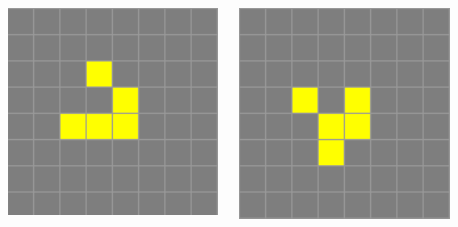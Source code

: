 \documentclass[20pt,margin=2.2cm,innermargin=-4.5in,blockverticalspace=-0.25in]{tikzposter}
\begin{document}
\begin{columns}
{        \begin{minipage}[t]{\linewidth}
            \centering
            \begin{minipage}[t]{0.15\linewidth}
                \includegraphics[width=\textwidth]{images/life-glider-1.png}
            \end{minipage}
            \begin{minipage}[t]{0.15\linewidth}
                \includegraphics[width=\textwidth]{images/life-glider-2.png}

\end{minipage}
\end{minipage}}
\end{columns}
\end{document}
